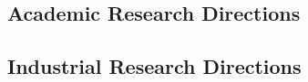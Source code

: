 \documentclass[11pt]{report}
\begin{document}
\subsection{Academic Research Directions}

\subsection{Industrial Research Directions}

\bigskip 

\clearpage{}
\singlespacing
%
%
%
%
%
%
%
%
%
%
%
%
%
%
%
%
%
%
%
%
%
%
%
%
%
%
%
%
%
%
%
%
%
%
%
%
%
%
%



\bigskip 

\appendix
%

\end{document}
